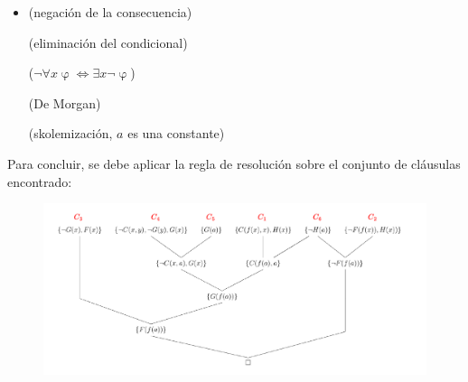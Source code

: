 \documentclass{article}
\begin{document}
\begin{itemize}
        {
        (De Morgan)}

        {
        (extereorizar cuantificador)}


  \item{
        (negación de la consecuencia)}

        {
        (eliminación del condicional)}

        {
        ($\neg \forall x \upvarphi \Leftrightarrow \exists x \neg \upvarphi$)}

        {
        (De Morgan)}

        {
        (skolemización, $a$ es una constante)}
\end{itemize}

Para concluir, se debe aplicar la regla de resolución sobre el conjunto de cláusulas encontrado:

\begin{figure}[H]
  \centering
  \includegraphics[width=.9\textwidth]{resolucion_lpo_02.pdf}
\end{figure}
\end{document}
